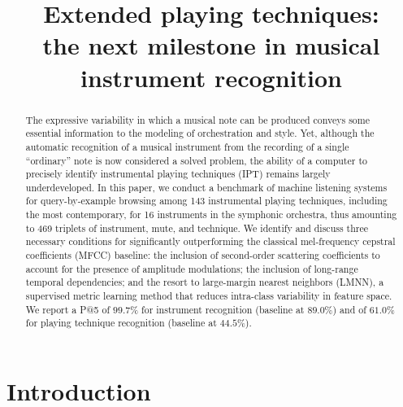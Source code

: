 \documentclass{article}
\title{Extended playing techniques: \\
the next milestone in musical instrument recognition}
\begin{document}
%
\maketitle


\begin{abstract}
The expressive variability in which a musical note can be produced conveys some essential information to the modeling of orchestration and style. Yet, although the automatic recognition of a musical instrument from the recording of a single ``ordinary'' note is now considered a solved problem, the ability of a computer to precisely identify instrumental playing techniques (IPT) remains largely underdeveloped.
In this paper, we conduct a benchmark of machine listening systems for query-by-example browsing among 143 instrumental playing techniques, including the most contemporary, for 16 instruments in the symphonic orchestra, thus amounting to 469 triplets of instrument, mute, and technique. We identify and discuss three necessary conditions for significantly outperforming the classical mel-frequency cepstral coefficients (MFCC) baseline: the inclusion of second-order scattering coefficients to account for the presence of amplitude modulations; the inclusion of long-range temporal dependencies; and the resort to large-margin nearest neighbors (LMNN), a supervised metric learning method that reduces intra-class variability in feature space.
We report a P@5 of $99.7\%$ for instrument recognition (baseline at $89.0\%$) and of $61.0\%$ for playing technique recognition (baseline at $44.5\%$).

\end{abstract}



\section{Introduction}\label{sec:introduction}
\end{document}
